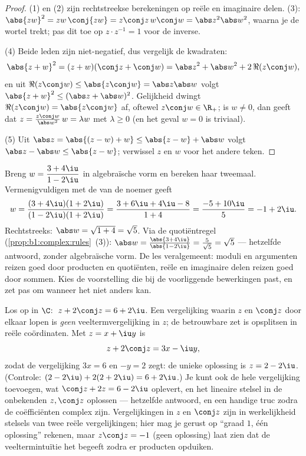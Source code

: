 \begin{proof}
(1) en (2) zijn rechtstreekse berekeningen op reële en imaginaire delen.
(3): $\abs{zw}^2 = zw\,\conj{zw} = z\conj z\, w \conj w = \abs z^2 \abs
w^2$, waarna je de wortel trekt; pas dit toe op $z \cdot z^{-1} = 1$ voor
de inverse.

(4) Beide leden zijn niet-negatief, dus vergelijk de kwadraten:
\[
\abs{z+w}^2 = (z+w)(\conj z + \conj w)
= \abs z^2 + \abs w^2 + 2\,\Re(z \conj w),
\]
en uit $\Re(z\conj w) \leq \abs{z \conj w} = \abs z \abs w$ volgt
$\abs{z+w}^2 \leq (\abs z + \abs w)^2$. Gelijkheid dwingt $\Re(z \conj w)
= \abs{z \conj w}$ af, oftewel $z \conj w \in \R_+$; is $w \neq 0$, dan
geeft dat $z = \frac{z\conj w}{\abs w^2}\, w = \lambda w$ met $\lambda
\geq 0$ (en het geval $w = 0$ is triviaal).

(5) Uit $\abs z = \abs{(z - w) + w} \leq \abs{z-w} + \abs w$ volgt $\abs
z - \abs w \leq \abs{z - w}$; verwissel $z$ en $w$ voor het andere teken.
\end{proof}

\begin{example}\label{ex:b1:complex:workout}
Breng $w = \dfrac{3 + 4\iu}{1 - 2\iu}$ in algebraïsche vorm en bereken
haar  tweemaal. Vermenigvuldigen met de  van de
noemer geeft
\[
w = \frac{(3 + 4\iu)(1 + 2\iu)}{(1 - 2\iu)(1 + 2\iu)}
= \frac{3 + 6\iu + 4\iu - 8}{1 + 4}
= \frac{-5 + 10\iu}{5} = -1 + 2\iu .
\]
Rechtstreeks: $\abs w = \sqrt{1 + 4} = \sqrt5$. Via de quotiëntregel
(\cref{prop:b1:complex:rules}~(3)): $\abs w = \frac{\abs{3 +
4\iu}}{\abs{1 - 2\iu}} = \frac5{\sqrt5} = \sqrt5$ --- hetzelfde
antwoord, zonder algebraïsche vorm. De les veralgemeent: moduli en
argumenten reizen goed door producten en quotiënten, reële en
imaginaire delen reizen goed door sommen. Kies de voorstelling die bij
de voorliggende bewerkingen past, en zet pas om wanneer het niet
anders kan.
\end{example}

\begin{example}\label{ex:b1:complex:conjeq}
Los op in $\C$: $\;z + 2\conj z = 6 + 2\iu$. Een vergelijking waarin
$z$ en $\conj z$ door elkaar lopen is \emph{geen} veeltermvergelijking
in $z$; de betrouwbare zet is opsplitsen in reële coördinaten. Met $z
= x + \iu y$ is
\[
z + 2\conj z = 3x - \iu y ,
\]
zodat de vergelijking $3x = 6$ en $-y = 2$ zegt: de unieke oplossing is
$z = 2 - 2\iu$. (Controle: $(2 - 2\iu) + 2(2 + 2\iu) = 6 + 2\iu$.) Je
kunt ook de hele vergelijking toevoegen, wat $\conj z + 2z = 6 - 2\iu$
oplevert, en het lineaire stelsel in de onbekenden $z, \conj z$
oplossen --- hetzelfde antwoord, en een handige truc zodra de
coëfficiënten complex zijn. Vergelijkingen in $z$ en $\conj z$ zijn in
werkelijkheid stelsels van twee reële vergelijkingen; hier mag je
gerust op ``graad $1$, één oplossing'' rekenen, maar $z\conj z = -1$
(geen oplossing) laat zien dat de veeltermintuïtie het begeeft zodra er
producten opduiken.
\end{example}

